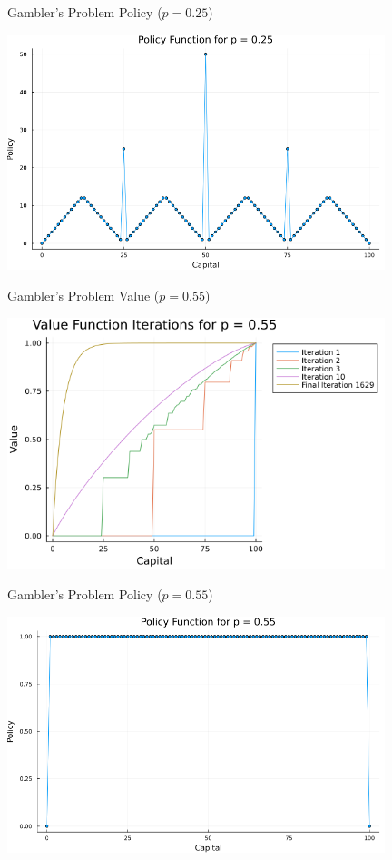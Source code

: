 \documentclass{beamer}
\begin{document}
\begin{frame}{Gambler's Problem Policy ($p = 0.25$)}
\begin{center}
	\includegraphics[width=11cm]{gamblers_problem_policy_p025.png}
		\end{center}
\end{frame}
\begin{frame}{Gambler's Problem Value ($p = 0.55$)}
\begin{center}
	\includegraphics[width=11cm]{gamblers_problem_value_p055.png}
		\end{center}
\end{frame}
\begin{frame}{Gambler's Problem Policy ($p = 0.55$)}
\begin{center}
	\includegraphics[width=11cm]{gamblers_problem_policy_p055.png}
		\end{center}
\end{frame}
\end{document}

